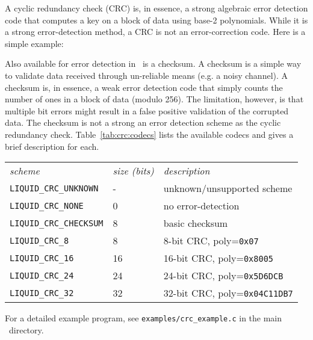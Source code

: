 A cyclic redundancy check (CRC) is, in essence, a strong algebraic error
detection code that computes a key on a block of data using base-2
polynomials.
While it is a strong error-detection method, a CRC is not an error-correction
code.
Here is a simple example:
%

%
Also available for error detection in \liquid\ is a checksum.
A checksum is a simple way to validate data received through un-reliable means
(e.g. a noisy channel).
A checksum is, in essence, a weak error detection code that simply counts the
number of ones in a block of data (modulo 256).
The limitation, however, is that multiple bit errors might result in a false
positive validation of the corrupted data.
The checksum is not a strong an error detection scheme as the cyclic
redundancy check.
%
Table~\ref{tab:crc:codecs} lists the available codecs and gives a brief
description for each.
%
\begin{table*}
\caption{Error-detection codecs available in \liquid}
\label{tab:crc:codecs}
\centering
{\small
\begin{tabular*}{0.85\textwidth}{l@{\extracolsep{\fill}}ll}
\toprule
{\it scheme} &
{\it size (bits)} &
{\it description}\\\otoprule
%
{\tt LIQUID\_CRC\_UNKNOWN}      & -     & unknown/unsupported scheme\\
{\tt LIQUID\_CRC\_NONE}         & 0     & no error-detection\\
{\tt LIQUID\_CRC\_CHECKSUM}     & 8     & basic checksum\\
{\tt LIQUID\_CRC\_8}            & 8     &  8-bit CRC, poly={\tt 0x07}\\
{\tt LIQUID\_CRC\_16}           & 16    & 16-bit CRC, poly={\tt 0x8005}\\
{\tt LIQUID\_CRC\_24}           & 24    & 24-bit CRC, poly={\tt 0x5D6DCB}\\
{\tt LIQUID\_CRC\_32}           & 32    & 32-bit CRC, poly={\tt 0x04C11DB7}\\\bottomrule

\end{tabular*}
}
\end{table*}%
%
For a detailed example program, see {\tt examples/crc\_example.c} in the
main \liquid\ directory.


